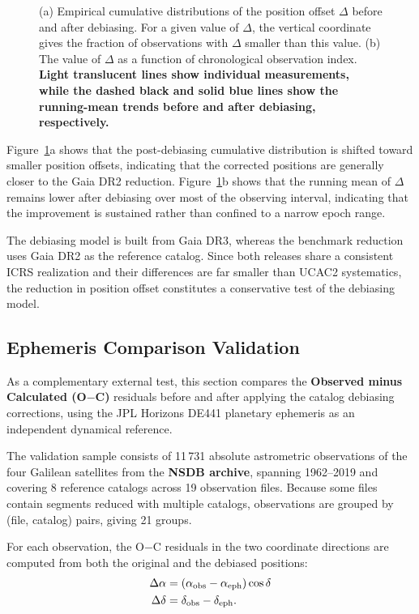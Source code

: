\documentclass[linenumbers,amsmath,manuscript]{aastex702}
\begin{document}
\begin{figure}[ht!]
\caption{(a) Empirical cumulative distributions of the position offset $\Delta$ before and after debiasing. For a given value of $\Delta$, the vertical coordinate gives the fraction of observations with $\Delta$ smaller than this value. (b) The value of $\Delta$ as a function of chronological observation index. \textbf{Light translucent lines show individual measurements, while the dashed black and solid blue lines show the running-mean trends before and after debiasing, respectively.}}
\label{fig:plate_validation}
\end{figure}

Figure~\ref{fig:plate_validation}a shows that the post-debiasing cumulative distribution is shifted toward smaller position offsets, indicating that the corrected positions are generally closer to the Gaia DR2 reduction. Figure~\ref{fig:plate_validation}b shows that the running mean of $\Delta$ remains lower after debiasing over most of the observing interval, indicating that the improvement is sustained rather than confined to a narrow epoch range.

The debiasing model is built from Gaia DR3, whereas the benchmark reduction uses Gaia DR2 as the reference catalog. Since both releases share a consistent ICRS realization and their differences are far smaller than UCAC2 systematics, the reduction in position offset constitutes a conservative test of the debiasing model.

\subsection{Ephemeris Comparison Validation}

As a complementary external test, this section compares the \textbf{Observed minus Calculated (O$-$C)} residuals before and after applying the catalog debiasing corrections, using the JPL Horizons DE441 planetary ephemeris \citep{Park2021DE441} as an independent dynamical reference.

The validation sample consists of 11\,731 absolute astrometric observations of the four Galilean satellites from the \textbf{NSDB archive}, spanning 1962--2019 and covering 8 reference catalogs across 19 observation files. Because some files contain segments reduced with multiple catalogs, observations are grouped by (file, catalog) pairs, giving 21 groups.

For each observation, the O$-$C residuals in the two coordinate directions are computed from both the original and the debiased positions:
\begin{equation}
\begin{aligned}
\Delta\alpha &= (\alpha_{\rm obs} - \alpha_{\rm eph})\cos\delta\\
\Delta\delta &= \delta_{\rm obs} - \delta_{\rm eph}.
\end{aligned}
\end{equation}
\end{document}
